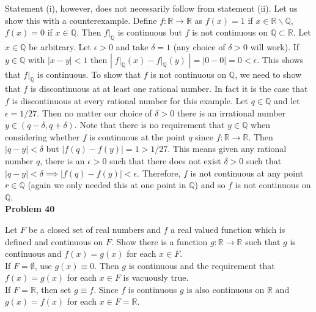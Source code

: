 \documentclass[a4paper]{article}
\begin{document}
Statement (i), however, does not necessarily follow from statement (ii). Let us show this with a counterexample. Define $f : \mathbb{R} \rightarrow \mathbb{R}$ as $f(x) = 1$ if $x \in \mathbb{R} \backslash \mathbb{Q}$, $f(x) = 0$ if $x \in \mathbb{Q}$. Then $f\rvert_\mathbb{Q}$ is continuous but $f$ is not continuous on $\mathbb{Q}\subset \mathbb{R}$. Let $x \in \mathbb{Q}$ be arbitrary. Let $\epsilon > 0$ and take $\delta = 1$ (any choice of $\delta > 0$ will work). If $y \in \mathbb{Q}$ with $|x-y|<1$ then $|\;f\rvert_\mathbb{Q}(x) - f\rvert_\mathbb{Q}(y)\;| = |0 - 0| = 0 <\epsilon$. This shows that $f\rvert_\mathbb{Q}$ is continuous. To show that $f$ is not continuous on $\mathbb{Q}$, we need to show that $f$ is discontinuous at at least one rational number. In fact it is the case that $f$ is discontinuous at every rational number for this example. Let $q \in \mathbb{Q}$ and let $\epsilon = 1/27$. Then no matter our choice of $\delta > 0$ there is an irrational number $ y \in (q-\delta, q+\delta)$. Note that there is no requirement that $y \in \mathbb{Q}$ when considering whether $f$ is continuous at the point $q$ since $f:\mathbb{R}\rightarrow \mathbb{R}$.  Then $|q-y| < \delta$ but $|f(q) - f(y)| = 1>1/27$. This means given any rational number $q$, there is an $\epsilon > 0$ such that there does not exist $\delta > 0$ such that $|q- y| < \delta \implies |f(q) - f(y)| < \epsilon$. Therefore, $f$ is not continuous at any point $r \in \mathbb{Q}$ (again we only needed this at one point in $\mathbb{Q}$) and so $f$ is not continuous on $\mathbb{Q}$. \\

{\bf Problem 40}

Let $F$ be a closed set of real numbers and $f$ a real valued function which is defined and continuous on $F$. Show there is a function $g : \mathbb{R}\rightarrow \mathbb{R}$ such that $g$ is continuous and $f(x) = g(x)$ for each $x \in F$. \\

If $F = \emptyset$, use $g(x) \equiv 0$. Then $g$ is continuous and the requirement that $f(x) = g(x)$ for each $x \in F$ is vacuously true.\\

If $F = \mathbb{R}$, then set $g \equiv f$. Since $f$ is continuous $g$ is also continuous on $\mathbb{R}$ and $g(x) = f(x)$ for each $x \in F = \mathbb{R}$. \\
\end{document}
